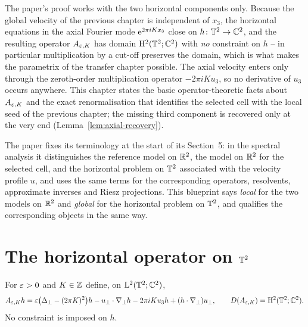 
The paper's proof works with the two horizontal components only.  Because the global
velocity of the previous chapter is independent of $x_3$, the horizontal equations in the
axial Fourier mode $\mathrm{e}^{2\pi iKx_3}$ close on $h\colon\mathbb{T}^2\to\mathbb{C}^2$, and the resulting
operator $A_{\varepsilon,K}$ has domain $\mathrm{H}^2(\mathbb{T}^2;\mathbb{C}^2)$ with \emph{no} constraint on $h$ --
in particular multiplication by a cut-off preserves the domain, which is what makes the
parametrix of the transfer chapter possible.  The axial velocity enters only through the
zeroth-order multiplication operator $-2\pi iKu_3$, so no derivative of $u_3$ occurs
anywhere.  This chapter states the basic operator-theoretic facts about $A_{\varepsilon,K}$ and
the exact renormalisation that identifies the selected cell with the local seed of the
previous chapter; the missing third component is recovered only at the very end
(Lemma~\ref{lem:axial-recovery}).

The paper fixes its terminology at the start of its Section~5: in the spectral analysis it
distinguishes the reference model on $\mathbb{R}^2$, the model on $\mathbb{R}^2$ for the selected cell, and the
horizontal problem on $\mathbb{T}^2$ associated with the velocity profile $u$, and uses the same terms
for the corresponding operators, resolvents, approximate inverses and Riesz projections.  This
blueprint says \emph{local} for the two models on $\mathbb{R}^2$ and \emph{global} for the horizontal
problem on $\mathbb{T}^2$, and qualifies the corresponding objects in the same way.

\section{The horizontal operator on $\mathbb{T}^2$}

\begin{definition}
  \label{def:operator:horizontal-induction}
  \leanok
  For $\varepsilon>0$ and $K\in\mathbb{Z}$ define, on $\mathrm{L}^2(\mathbb{T}^2;\mathbb{C}^2)$,
  \begin{equation}
    A_{\varepsilon,K}h=\varepsilon\bigl(\Delta_\perp-(2\pi K)^2\bigr)h
      -u_\perp\cdot\nabla_\perp h-2\pi iKu_3h+(h\cdot\nabla_\perp)u_\perp,
    \qquad D(A_{\varepsilon,K})=\mathrm{H}^2(\mathbb{T}^2;\mathbb{C}^2).
    \label{eq:operator:torus-sector}
  \end{equation}
  No constraint is imposed on $h$.
\end{definition}


